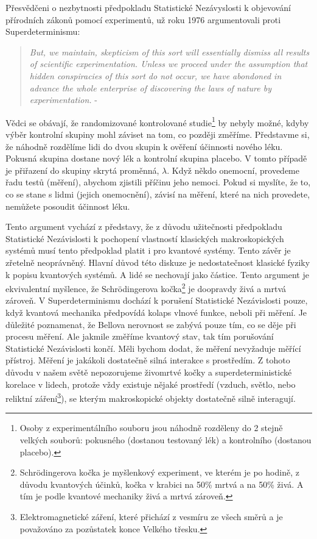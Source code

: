 Přesvědčeni o nezbytnosti předpokladu Statistické Nezávyslosti k objevování přírodních zákonů pomocí experimentů, \citeauthor{ArgSciMeth:1} už roku 1976 argumentovali proti Superdeterminismu:
\begin{quote}
    \emph{But, we maintain, skepticism of this sort will essentially dismiss all results of scientific experimentation. Unless we proceed under the assumption that hidden conspiracies of this sort do not occur, we have abondoned in advance the whole enterprise of discovering the laws of nature by experimentation.} - \cite{ArgSciMeth:1}
\end{quote}

Vědci se obávají, že randomizované kontrolované studie\footnote[14]{Osoby z experimentálního souboru jsou náhodně rozděleny do 2 stejně velkých souborů: pokusného (dostanou testovaný lék) a kontrolního (dostanou placebo).} by nebyly možné, kdyby výběr kontrolní skupiny mohl záviset na tom, co později změříme. Představme si, že náhodně rozdělíme lidi do dvou skupin k ověření účinnosti nového léku. Pokusná skupina dostane nový lék a kontrolní skupina placebo. V tomto případě je přiřazení do skupiny skrytá proměnná, $\lambda$. Když někdo onemocní, provedeme řadu testů (měření), abychom zjistili příčinu jeho nemoci. Pokud si myslíte, že to, co se stane s lidmi (jejich onemocnění), závisí na měření, které na nich provedete, nemůžete posoudit účinnost léku.

Tento argument vychází z představy, že z důvodu užitečnosti předpokladu Statistické Nezávislosti k pochopení vlastností klasických makroskopických systémů musí tento předpoklad platit i pro kvantové systémy. Tento závěr je zřetelně neoprávněný. Hlavní důvod této diskuze je nedostatečnost klasické fyziky k popisu kvantových systémů. A lidé se nechovají jako částice. Tento argument je ekvivalentní myšlence, že Schrödingerova kočka\footnote[15]{Schrödingerova kočka je myšlenkový experiment, ve kterém je po hodině, z důvodu kvantových účinků, kočka v krabici na 50\% mrtvá a na 50\% živá. A tím je podle kvantové mechaniky živá a mrtvá zároveň.} je doopravdy živá a mrtvá zároveň. V Superdeterminismu dochází k porušení Statistické Nezávislosti pouze, když kvantová mechanika předpovídá kolaps vlnové funkce, neboli při měření. Je důležité poznamenat, že Bellova nerovnost se zabývá pouze tím, co se děje při procesu měření. Ale jakmile změříme kvantový stav, tak tím porušování Statistické Nezávislosti končí. Měli bychom dodat, že měření nevyžaduje měřící přístroj. Měření je jakákoli dostatečně silná interakce s prostředím. Z tohoto důvodu v našem světě nepozorujeme živomrtvé kočky a superdeterministické korelace v lidech, protože vždy existuje nějaké prostředí (vzduch, světlo, nebo reliktní záření\footnote[16]{Elektromagnetické záření, které přichází z vesmíru ze všech směrů a je považováno za pozůstatek konce Velkého třesku.}), se kterým makroskopické objekty dostatečně silně interagují.